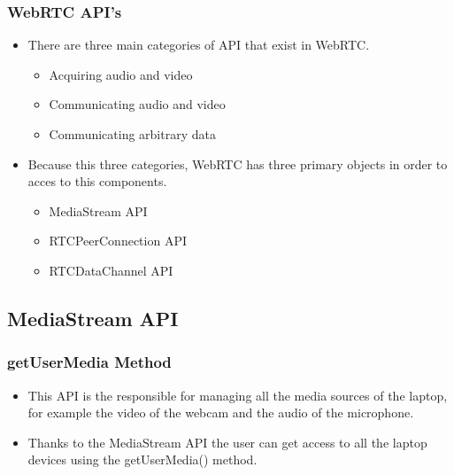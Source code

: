 
\begin{frame}[fragile]\frametitle{WebRTC API's}
\begin{itemize}
\item There are three main categories of API that exist in WebRTC.
  \begin{itemize}
  \item Acquiring audio and video
  \item Communicating audio and video
  \item Communicating arbitrary data
  \end{itemize}
\item Because this three categories, WebRTC has three primary objects in order to acces to this components.
  \begin{itemize}
  \item MediaStream API
  \item RTCPeerConnection API
  \item RTCDataChannel API
  \end{itemize}
\end{itemize}
\end{frame}

\subsection{MediaStream API}
\begin{frame}[fragile]\frametitle{getUserMedia Method}
\begin{itemize}
\item This API is the responsible for managing all the media sources of the laptop, for example
the video of the webcam and the audio of the microphone.
\item Thanks to the MediaStream API the user can get access to all the laptop devices using the 
getUserMedia() method.
\end{itemize}
\end{frame}

